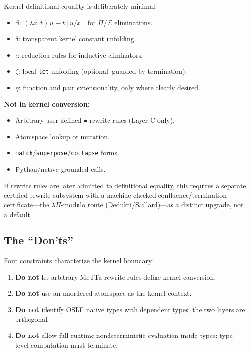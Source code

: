 \documentclass[11pt]{article}
\newcommand{\code}[1]{\texttt{#1}}
\begin{document}
Kernel definitional equality is deliberately minimal:

\begin{itemize}
  \item $\beta$: $(\lambda x.\, t)\, u \equiv t[u/x]$ for $\Pi$/$\Sigma$ eliminations.
  \item $\delta$: transparent kernel constant unfolding.
  \item $\iota$: reduction rules for inductive eliminators.
  \item $\zeta$: local \code{let}-unfolding (optional, guarded by termination).
  \item $\eta$: function and pair extensionality, only where clearly desired.
\end{itemize}

\textbf{Not in kernel conversion:}
\begin{itemize}
  \item Arbitrary user-defined \code{=} rewrite rules (Layer C only).
  \item Atomspace lookup or mutation.
  \item \code{match}/\code{superpose}/\code{collapse} forms.
  \item Python/native grounded calls.
\end{itemize}

If rewrite rules are later admitted to definitional equality, this requires a
separate certified rewrite subsystem with a machine-checked
confluence/termination certificate---the $\lambda\Pi$-modulo route
(Dedukti/Saillard)---as a distinct upgrade, not a default.

\subsection{The ``Don'ts''}

Four constraints characterize the kernel boundary:
\begin{enumerate}
  \item \textbf{Do not} let arbitrary MeTTa rewrite rules define kernel conversion.
  \item \textbf{Do not} use an unordered atomspace as the kernel context.
  \item \textbf{Do not} identify OSLF native types with dependent types; the
        two layers are orthogonal.
  \item \textbf{Do not} allow full runtime nondeterministic evaluation inside
        types; type-level computation must terminate.
\end{enumerate}
\end{document}
